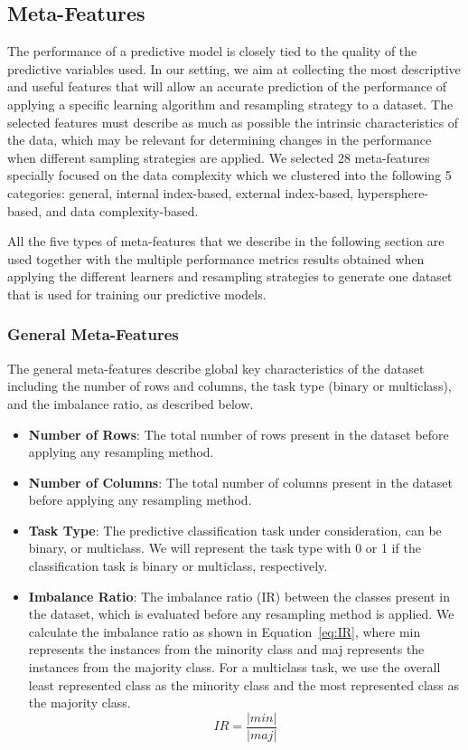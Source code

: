 \documentclass{article}
\begin{document}
\subsection{Meta-Features}\label{subsec:metaf}
The performance of a predictive model is closely tied to the quality of the predictive variables used. In our setting, we aim at collecting the most descriptive and useful features that will allow an accurate prediction of the performance of applying a specific learning algorithm and resampling strategy to a dataset. The selected features must describe as much as possible the intrinsic characteristics of the data, which may be relevant for determining changes in the performance when different sampling strategies are applied. We selected 28 meta-features specially focused on the data complexity which we clustered into the following 5 categories: general, internal index-based, external index-based, hypersphere-based, and data complexity-based.

All the five types of meta-features that we describe in the following section are used together with the multiple performance metrics results obtained when applying the different learners and resampling strategies to generate one dataset that is used for training our predictive models.

\subsubsection{General Meta-Features}
The general meta-features describe global key characteristics of the dataset including the number of rows and columns, the task type (binary or multiclass), and the imbalance ratio, as described below.

\begin{itemize}
    \item \textbf{Number of Rows}: The total number of rows present in the dataset before applying any resampling method.
    \item \textbf{Number of Columns}: The total number of columns present in the dataset before applying any resampling method.
    \item \textbf{Task Type}: The predictive classification task under consideration, can be binary, or multiclass. We will represent the task type with 0 or 1 if the classification task is binary or multiclass, respectively.
    \item \textbf{Imbalance Ratio}: The imbalance ratio (IR) between the classes present in the dataset, which is evaluated before any resampling method is applied. We calculate the imbalance ratio as shown in Equation~\autoref{eq:IR}, where min represents the instances from the minority class and maj represents the instances from the majority class. For a multiclass task, we use the overall least represented class as the minority class and the most represented class as the majority class. 
     \begin{equation}
     IR= \frac{|min|}{|maj|}
     \label{eq:IR}
     \end{equation}
\end{itemize}
\end{document}
